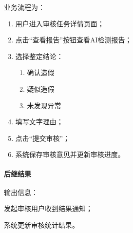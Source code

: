 业务流程为：

\begin{enumerate}
    \item 用户进入审核任务详情页面；
    \item 点击“查看报告”按钮查看AI检测报告；
    \item 选择鉴定结论：
    \begin{enumerate}
        \item 确认造假
        \item 疑似造假
        \item 未发现异常
    \end{enumerate}
    \item 填写文字理由；
    \item 点击“提交审核”；
    \item 系统保存审核意见并更新审核进度。
\end{enumerate}

\paragraph*{后继结果}

输出信息：

发起审核用户收到结果通知；

系统更新审核统计结果。

